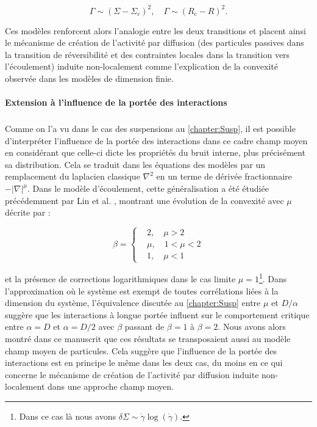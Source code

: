 \begin{equation}
	\Gamma \sim (\Sigma - \Sigma_c)^2,\quad \Gamma \sim (R_c-R)^2.
\end{equation}

\noindent Ces modèles renforcent alors l'analogie entre les deux transitions et placent ainsi le mécanisme de création de l'activité par diffusion (des particules passives dans la transition de réversibilité et des contraintes locales dans la transition vers l'écoulement) induite non-localement comme l'explication de la convexité observée dans les modèles de dimension finie.

\paragraph{Extension à l'influence de la portée des interactions}

\subparagraph{}Comme on l'a vu dans le cas des suspensions au \autoref{chapter:Susp}, il est possible d’interpréter l'influence de la portée des interactions dans ce cadre champ moyen en considérant que celle-ci dicte les propriétés du bruit interne, plus précisément sa distribution. Cela se traduit dans les équations des modèles par un remplacement du laplacien classique $\nabla^2$ en un terme de dérivée fractionnaire $-|\nabla|^\mu$. Dans le modèle d'écoulement, cette généralisation a été étudiée précédemment par Lin et al. \cite{lin_mean_field_2016, lin_microscopic_2018}, montrant une évolution de la convexité avec $\mu$ décrite par :

\begin{equation}
	\beta = \left\{
	\begin{aligned}
	&2, \quad \mu > 2\\
	&\mu, \quad 1<\mu<2\\
	&1, \quad \mu < 1
	\end{aligned}
	\right.
\end{equation}

\noindent et la présence de corrections logarithmiques dans le cas limite $\mu = 1$\footnote{Dans ce cas là nous avons $\delta\Sigma \sim \dot{\gamma}\log(\dot{\gamma})$.}. Dans l'approximation où le système est exempt de toutes corrélations liées à la dimension du système, l'équivalence discutée au \autoref{chapter:Susp} entre $\mu$ et $D/\alpha$ suggère que les interactions à longue portée influent sur le comportement critique entre $\alpha = D$ et $\alpha = D/2$ avec $\beta$ passant de $\beta = 1$ à $\beta = 2$. Nous avons alors montré dans ce manuscrit que ces résultats se transposaient aussi au modèle champ moyen de particules. Cela suggère que l'influence de la portée des interactions est en principe le même dans les deux cas, du moins en ce qui concerne le mécanisme de création de l'activité par diffusion induite non-localement dans une approche champ moyen.

